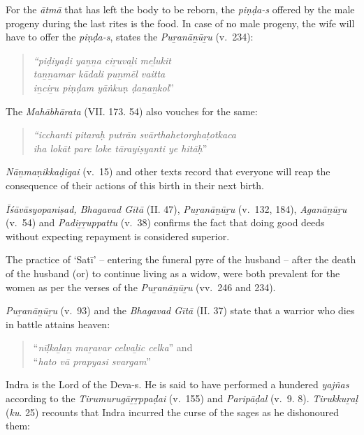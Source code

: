 For the \textit{ātmā} that has left the body to be reborn, the \textit{piṇḍa-s} offered by the male progeny during the last rites is the food. In case of no male progeny, the wife will have to offer the \textit{piṇḍa-s}, states the \textit{Puṟanāṉūṟu} (v.~234):

\begin{quote}
\textit{“piḍiyaḍi yaṉṉa ciṟuvaḻi meḻukit}\\\textit{taṉṉamar kādali puṉmēl vaitta}\\\textit{iṉciṟu piṇḍam yāṅkuṇ ḍaṉaṉkol}”
\end{quote}

The \textit{Mahābhārata} (VII. 173. 54) also vouches for the same:

\begin{quote}
\textit{“icchanti pitaraḥ putrān svārthahetorghaṭotkaca}\\\textit{iha lokāt pare loke tārayiṣyanti ye hitāḥ}”
\end{quote}

\textit{Nāṉmaṇikkaḍigai} (v.~15) and other texts record that everyone will reap the consequence of their actions of this birth in their next birth.

\textit{Īśāvāsyopaniṣad, Bhagavad Gītā} (II. 47), \textit{Puṟanāṉūṟu} (v.\ 132, 184), \textit{Aganāṉūṟu \\} (v.~54) and \textit{Padiṟṟuppattu} (v.~38) confirms the fact that doing good deeds without expecting repayment is considered superior.

The practice of ‘Satī’ – entering the funeral pyre of the husband – after the death of the husband (or) to continue living as a widow, were both prevalent for the women as per the verses of the \textit{Puṟanāṉūṟu} (vv.~246 and 234).

\textit{Puṟanāṉūṟu} (v.~93) and the \textit{Bhagavad Gītā} (II. 37) state that a warrior who dies in battle attains heaven:

\begin{quote}
“\textit{nīḷkaḻaṉ maṟavar celvaḻic celka}” and \\ “\textit{hato vā prapyasi svargam}”
\end{quote}

Indra is the Lord of the Deva-s. He is said to have performed a hundered \textit{yajñas} according to the \textit{Tirumurugāṟṟppaḍai} (v.~155) and \textit{Paripāḍal} (v.~9. 8). \textit{Tirukkuṟaḷ} (\textit{ku}. 25) recounts that Indra incurred the curse of the sages as he dishonoured them:

